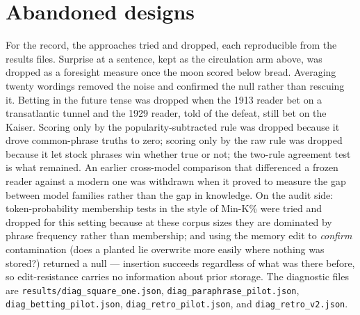 \documentclass[11pt]{article}
\begin{document}
\section{Abandoned designs}\label{app:graveyard}
For the record, the approaches tried and dropped, each reproducible from the results files. Surprise at a
sentence, kept as the circulation arm above, was dropped as a foresight measure once the moon scored below
bread. Averaging twenty wordings removed the noise and confirmed the null rather than rescuing it. Betting
in the future tense was dropped when the 1913 reader bet on a transatlantic tunnel and the 1929 reader, told
of the defeat, still bet on the Kaiser. Scoring only by the popularity-subtracted rule was dropped because
it drove common-phrase truths to zero; scoring only by the raw rule was dropped because it let stock phrases
win whether true or not; the two-rule agreement test is what remained. An earlier cross-model comparison
that differenced a frozen reader against a modern one was withdrawn when it proved to measure the gap between
model families rather than the gap in knowledge. On the audit side: token-probability membership tests in
the style of Min-K\% \citep{shi2024} were tried and dropped for this setting because at these corpus sizes
they are dominated by phrase frequency rather than membership; and using the memory edit to \emph{confirm}
contamination (does a planted lie overwrite more easily where nothing was stored?) returned a null ---
insertion succeeds regardless of what was there before, so edit-resistance carries no information about
prior storage. The diagnostic files are \texttt{results/diag\_square\_one.json},
\texttt{diag\_paraphrase\_pilot.json}, \texttt{diag\_betting\_pilot.json}, \texttt{diag\_retro\_pilot.json},
and \texttt{diag\_retro\_v2.json}.
\end{document}
